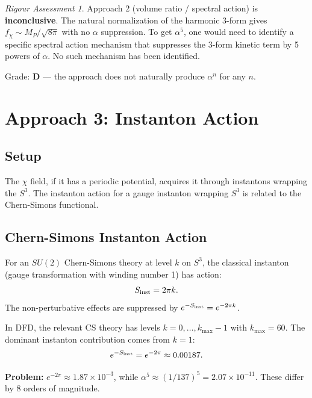 \documentclass[11pt]{article}
\theoremstyle{definition}
\theoremstyle{remark}
\newtheorem*{assessment}{Rigour Assessment}
\begin{document}
\begin{assessment}
Approach 2 (volume ratio / spectral action) is \textbf{inconclusive}. The natural
normalization of the harmonic 3-form gives $f_\chi \sim M_P/\sqrt{8\pi}$ with
no $\alpha$ suppression. To get $\alpha^5$, one would need to identify a specific
spectral action mechanism that suppresses the 3-form kinetic term by 5 powers of
$\alpha$. No such mechanism has been identified.

Grade: \textbf{D} --- the approach does not naturally produce $\alpha^n$ for any $n$.
\end{assessment}


\section{Approach 3: Instanton Action}
\label{sec:instanton}

\subsection{Setup}

The $\chi$ field, if it has a periodic potential, acquires it through instantons
wrapping the $S^3$. The instanton action for a gauge instanton wrapping $S^3$
is related to the Chern-Simons functional.

\subsection{Chern-Simons Instanton Action}

For an $SU(2)$ Chern-Simons theory at level $k$ on $S^3$, the classical
instanton (gauge transformation with winding number 1) has action:
\begin{equation}
S_{\rm inst} = 2\pi k.
\end{equation}
The non-perturbative effects are suppressed by $e^{-S_{\rm inst}} = e^{-2\pi k}$.

In DFD, the relevant CS theory has levels $k = 0, \ldots, k_{\max} - 1$ with
$k_{\max} = 60$. The dominant instanton contribution comes from $k = 1$:
\begin{equation}
e^{-S_{\rm inst}} = e^{-2\pi} \approx 0.00187.
\end{equation}

\textbf{Problem:} $e^{-2\pi} \approx 1.87 \times 10^{-3}$, while
$\alpha^5 \approx (1/137)^5 = 2.07 \times 10^{-11}$. These differ by
8 orders of magnitude.
\end{document}
